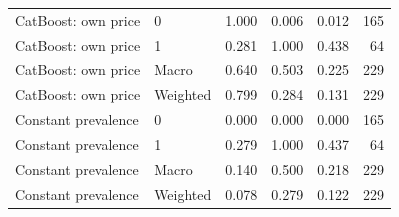 \begin{longtable}{@{}p{.34\linewidth}p{.15\linewidth}rrrr@{}}
CatBoost: own price & 0 & 1.000 & 0.006 & 0.012 & 165\\
CatBoost: own price & 1 & 0.281 & 1.000 & 0.438 & 64\\
CatBoost: own price & Macro & 0.640 & 0.503 & 0.225 & 229\\
CatBoost: own price & Weighted & 0.799 & 0.284 & 0.131 & 229\\
Constant prevalence & 0 & 0.000 & 0.000 & 0.000 & 165\\
Constant prevalence & 1 & 0.279 & 1.000 & 0.437 & 64\\
Constant prevalence & Macro & 0.140 & 0.500 & 0.218 & 229\\
Constant prevalence & Weighted & 0.078 & 0.279 & 0.122 & 229\\
\bottomrule\end{longtable}\endgroup
